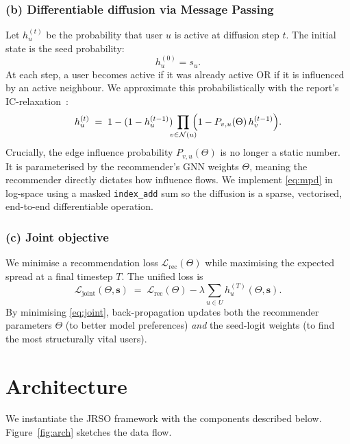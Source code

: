 \documentclass[conference]{IEEEtran}
\begin{document}
\subsubsection*{(b) Differentiable diffusion via Message Passing}
Let $h^{(t)}_u$ be the probability that user $u$ is active at diffusion
step $t$. The initial state is the seed probability:
\[
h_u^{(0)}=s_u.
\]
At each step, a user becomes active if it was already active OR if it is
influenced by an active neighbour. We approximate this probabilistically
with the report's IC-relaxation~\cite{shakarian2015independent}:
\begin{equation}
h_u^{(t)} \;=\; 1-(1-h_u^{(t-1)})\!\!\!\prod_{v\in\mathcal{N}(u)}\!\!\!\Bigl(1-P_{v,u}(\Theta)\,h_v^{(t-1)}\Bigr).
\label{eq:mpd}
\end{equation}
Crucially, the edge influence probability $P_{v,u}(\Theta)$ is no
longer a static number. It is parameterised by the recommender's GNN
weights $\Theta$, meaning the recommender directly dictates how
influence flows. We implement \eqref{eq:mpd} in log-space using a
masked \texttt{index\_add} sum so the diffusion is a sparse, vectorised,
end-to-end differentiable operation.

\subsubsection*{(c) Joint objective}
We minimise a recommendation loss $\mathcal{L}_{\text{rec}}(\Theta)$
while maximising the expected spread at a final timestep $T$. The
unified loss is
\begin{equation}
\mathcal{L}_{\text{joint}}(\Theta,\mathbf{s}) \;=\;
\mathcal{L}_{\text{rec}}(\Theta)
- \lambda \sum_{u\in U} h_u^{(T)}(\Theta,\mathbf{s}).
\label{eq:joint}
\end{equation}
By minimising \eqref{eq:joint}, back-propagation updates both the
recommender parameters $\Theta$ (to better model preferences) \emph{and}
the seed-logit weights (to find the most structurally vital users).

\section{Architecture}

We instantiate the JRSO framework with the components described below.
Figure~\ref{fig:arch} sketches the data flow.
\end{document}
